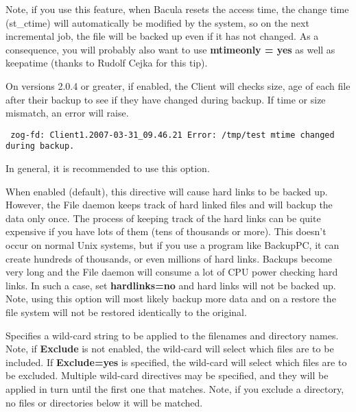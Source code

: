 \begin{description}
   Note, if you use this feature, when Bacula resets the access time, the
   change time (st\_ctime) will automatically be modified by the system,
   so on the next incremental job, the file will be backed up even if
   it has not changed. As a consequence, you will probably also want
   to use {\bf mtimeonly = yes} as well as keepatime (thanks to
   Rudolf Cejka for this tip).

\item [checkfilechanges=yes\vb{}no]
   On versions 2.0.4 or greater, 
   if enabled, the Client will checks size, age of each file after 
   their backup to see if they have changed during backup. If time 
   or size mismatch, an error will raise.

\begin{verbatim}
 zog-fd: Client1.2007-03-31_09.46.21 Error: /tmp/test mtime changed during backup.
\end{verbatim}

   In general, it is recommended to use this option.

\item [hardlinks=yes\vb{}no]
   When enabled (default), this directive will cause hard links to be 
   backed up. However, the File daemon keeps track of hard linked files and
   will backup the data only once. The process of keeping track of the 
   hard links can be quite expensive if you have lots of them (tens of
   thousands or more). This doesn't occur on normal Unix systems, but if
   you use a program like BackupPC, it can create hundreds of thousands, or
   even millions of hard links. Backups become very long and the File daemon
   will consume a lot of CPU power checking hard links.  In such a case,
   set {\bf hardlinks=no} and hard links will not be backed up.  Note, using
   this option will most likely backup more data and on a restore the file
   system will not be restored identically to the original.

\item [wild=\lt{}string\gt{}]
   Specifies a wild-card string to be applied to the filenames and
   directory names.  Note, if {\bf Exclude} is not enabled, the wild-card
   will select which files are to be included.  If {\bf Exclude=yes} is
   specified, the wild-card will select which files are to be excluded.
   Multiple wild-card directives may be specified, and they will be applied
   in turn until the first one that matches.  Note, if you exclude a
   directory, no files or directories below it will be matched.


\end{description}

